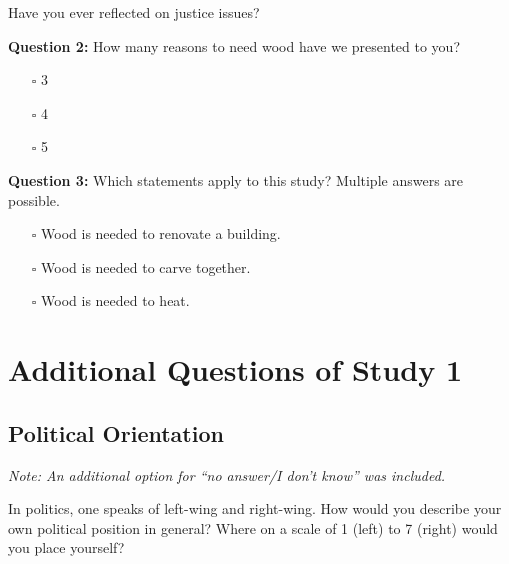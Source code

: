 \documentclass[egregdoesnotlikesansseriftitles]{scrartcl}
\begin{document}
Have you ever reflected on justice issues?\vspace{1ex} %

\noindent\textbf{Question 2:} How many reasons to need wood have we presented to you? %
\begin{itemize}
   \item[$\square$] 3
   \item[$\square$] 4
   \item[$\square$] 5
\end{itemize}
\vspace{1ex}

\noindent\textbf{Question 3:} Which statements apply to this study? %
Multiple answers are possible. %
\begin{itemize}
   \item[$\square$] Wood is needed to renovate a building. %
   \item[$\square$] Wood is needed to carve together. %
   \item[$\square$] Wood is needed to heat. %
\end{itemize}


\clearpage
\section{Additional Questions of Study 1}\label{sec:app_study_1_additional_questions}
\subsection*{Political Orientation}
\noindent\textit{Note: An additional option for ``no answer/I don't know'' was included.}\vspace{1ex}

\noindent In politics, one speaks of left-wing and right-wing. %
How would you describe your own political position in general? %
Where on a scale of 1 (left) to 7 (right) would you place yourself? %
\end{document}
